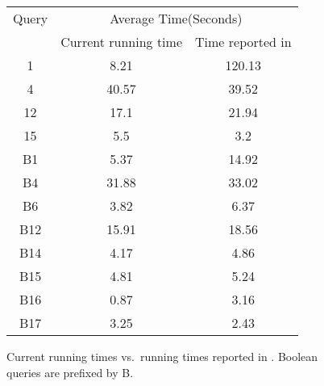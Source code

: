 \begin{figure}[htp]

\begin{center}
  \begin{tabular}{ | c | c | c | }
    \hline
    Query &  \multicolumn{2}{|c|}{Average Time(Seconds)} \\ \cline{2-3}
           &  Current running time & Time reported in \cite{OHK2008} \\ \hline
	1 & 8.21 & 120.13 \\ \hline
	4 & 40.57 & 39.52 \\ \hline
	12 & 17.1 & 21.94 \\ \hline
	15 & 5.5 & 3.2 \\ \hline
	B1 & 5.37 & 14.92 \\ \hline
	B4 & 31.88 & 33.02 \\ \hline
	B6 & 3.82 & 6.37 \\ \hline
	B12 & 15.91 & 18.56 \\ \hline
	B14 & 4.17 & 4.86 \\ \hline
	B15 & 4.81 & 5.24 \\ \hline
	B16 & 0.87 & 3.16 \\ \hline
	B17 & 3.25 & 2.43 \\ \hline

  \end{tabular}
\end{center} 
\caption{Current running times vs.\ running times reported in \cite{OHK2008}.
Boolean queries are prefixed by B. }

\end{figure}



